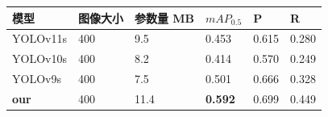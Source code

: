 \begin{table}[H]
    \centering
    \captionsetup{font=footnotesize}
    \label{tab:compare_studies_fogtt100k}
    \begin{tabular}{p{}p{}p{}p{}p{}p{}}
        \toprule
        模型         & 图像大小 & 参数量 MB & $mAP_{0.5}$   & P     & R     \\ 
        \midrule
        YOLOv11s     & 400     & 9.5     & 0.453         & 0.615  & 0.280 \\
        YOLOv10s     & 400     & 8.2     & 0.414         & 0.570  & 0.249 \\
        YOLOv9s      & 400     & 7.5     & 0.501         & 0.666  & 0.328 \\
        \textbf{our} & 400     & 11.4    & \textbf{0.592} & 0.699  & 0.449 \\
        \bottomrule
    \end{tabular}
\end{table}

